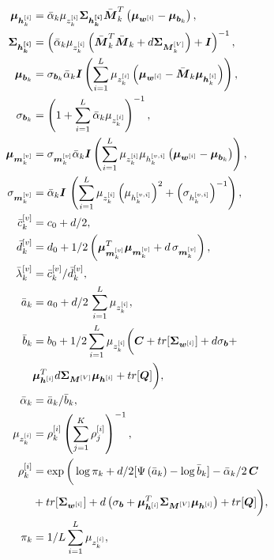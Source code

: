  \begin{align*}
 \Vhik &= \ValphaNk \Vzik \Vgik \VWVk^T\left(\Vwi - \Vwok\right), \\ 
     \Vgik &= \left( \ValphaNk  \Vzik \left(\VWVk^T \VWVk + d \VLVk \right) + \vec
 I\right)^{-1}, \\
 \Vwok &= \Vlok \ValphaNk \vec I \left( \sum_{i=1}^L \Vzik \left(\Vwi - \VWVk \Vhik\right) \right), \\
 \Vlok &= \left(1 + \sum_{i=1}^L \ValphaNk \Vzik\right)^{-1}, \\
 \Vwvk &= \Vlvk \ValphaNk \vec I \left( \sum_{i=1}^L \Vzik \Vhivk \left(\Vwi - \Vwok\right) \right), \\
 \Vlvk &= \ValphaNk \vec I \, \left(\sum_{i=1}^L \Vzik \left(\Vhivk\right)^2 + \left(\Vsgivk\right)^{-1}\right),\\
  \VcvNk &= c_0 + d / 2, \\
 \VdvNk &= d_0 + 1/2 \left(\Vwvk^T \Vwvk + d \, \Vlvk\right),\\
 \VlambdavNk &= \VcvNk / \VdvNk, \\
 \VaNk &= a_0 + d / 2 \, \sum_{i=1}^L \Vzik, \\
 \VbNk &= b_0 + 1 / 2 \sum_{i=1}^L \Vzik \bigg( \vec C + tr[\VSi] + d \Vlo + \\
  & \Vhi^T d \VLV \Vhi + tr[\vec Q] \bigg), \\
 \ValphaNk &= \VaNk / \VbNk,\\
 \Vzik &= \rhoi{k} \left(\sum_{j=1}^K \rhoi{j}\right)^{-1}, \\
  \rhoi{k}&= \exp \bigg( \log{\pi_k} + d / 2 [\Psi\left(\VaNk\right) - \log{\VbNk}] - \ValphaNk / 2 \, \vec C \\
  & + tr[\VSi] + d \left(\Vlo + \Vhi^T \VLV \Vhi\right) + tr[\vec Q] \bigg), \\
  \pi_k &= 1 / L \sum_{i=1}^{L} \Vzik, 
 \end{align*}
